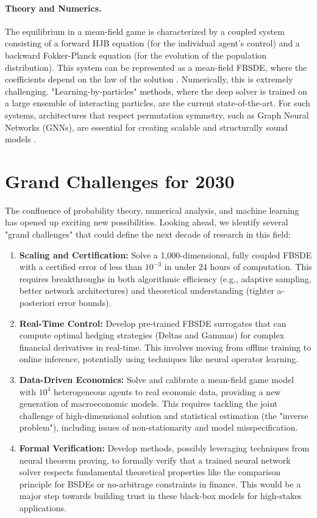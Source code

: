 \documentclass[11pt,letterpaper,oneside]{article}
\theoremstyle{plain}
\theoremstyle{definition}
\theoremstyle{remark}
\begin{document}
\paragraph{Theory and Numerics.} The equilibrium in a mean-field game is characterized by a coupled system consisting of a forward HJB equation (for the individual agent's control) and a backward Fokker-Planck equation (for the evolution of the population distribution). This system can be represented as a mean-field FBSDE, where the coefficients depend on the law of the solution \cite{Carmona2016}. Numerically, this is extremely challenging. "Learning-by-particles" methods, where the deep solver is trained on a large ensemble of interacting particles, are the current state-of-the-art. For such systems, architectures that respect permutation symmetry, such as Graph Neural Networks (GNNs), are essential for creating scalable and structurally sound models \cite{MAGNet2019, GMADDPG2023}.

\section{Grand Challenges for 2030}
\label{sec:challenges}

The confluence of probability theory, numerical analysis, and machine learning has opened up exciting new possibilities. Looking ahead, we identify several "grand challenges" that could define the next decade of research in this field:

\begin{enumerate}[label=\textbf{C\arabic*}. ,leftmargin=1.6em]
  \item \textbf{Scaling and Certification:} Solve a 1,000-dimensional, fully coupled FBSDE with a certified error of less than \(10^{-3}\) in under 24 hours of computation. This requires breakthroughs in both algorithmic efficiency (e.g., adaptive sampling, better network architectures) and theoretical understanding (tighter a-posteriori error bounds).
  \item \textbf{Real-Time Control:} Develop pre-trained FBSDE surrogates that can compute optimal hedging strategies (Deltas and Gammas) for complex financial derivatives in real-time. This involves moving from offline training to online inference, potentially using techniques like neural operator learning.
  \item \textbf{Data-Driven Economics:} Solve and calibrate a mean-field game model with \(10^4\) heterogeneous agents to real economic data, providing a new generation of macroeconomic models. This requires tackling the joint challenge of high-dimensional solution and statistical estimation (the "inverse problem"), including issues of non-stationarity and model misspecification.
  \item \textbf{Formal Verification:} Develop methods, possibly leveraging techniques from neural theorem proving, to formally verify that a trained neural network solver respects fundamental theoretical properties like the comparison principle for BSDEs or no-arbitrage constraints in finance. This would be a major step towards building trust in these black-box models for high-stakes applications.
\end{enumerate}
\end{document}
